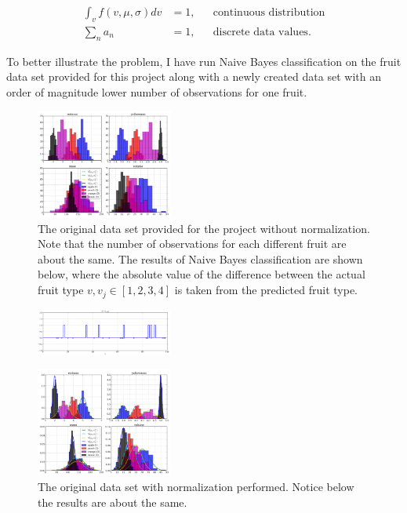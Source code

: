 \begin{align*}
  \int_v f(v,\mu,\sigma) dv &= 1, && \text{continuous distribution} \\
  \sum_n a_n &= 1, && \text{discrete data values}.
\end{align*}

To better illustrate the problem, I have run Naive Bayes classification on the fruit data set provided for this project along with a newly created data set with an order of magnitude lower number of observations for one fruit.

\newpage

\begin{multicols}{2}
\begin{figure}[H]
  \centering
		\includegraphics[width=0.4\textwidth]{images/not_normed_original.png}
  \caption{\scriptsize The original data set provided for the project without normalization.  Note that the number of observations for each different fruit are about the same.  The results of Naive Bayes classification are shown below, where the absolute value of the difference between the actual fruit type $v, v_j \in [1,2,3,4]$ is taken from the predicted fruit type.}
\end{figure}

\begin{figure}[H]
  \centering
		\includegraphics[width=0.4\textwidth]{images/results_original_not_normed.png}
\end{figure}

\begin{figure}[H]
  \centering
		\includegraphics[width=0.4\textwidth]{images/normed_original.png}
  \caption{\scriptsize The original data set with normalization performed.  Notice below the results are about the same.}
\end{figure}


\end{multicols}
